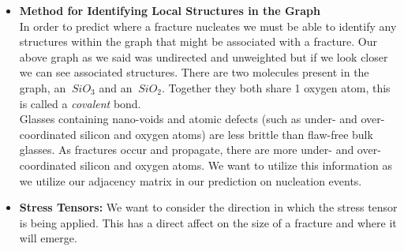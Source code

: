 \begin{itemize}
\item \textbf{Method for Identifying Local Structures in the Graph}
\bigskip
\\
In order to predict where a fracture nucleates we must be able to identify any structures within the graph that might be associated with a fracture. Our above graph as we said was undirected and unweighted but if we look closer we can see associated structures. There are two molecules present in the graph, an $\ SiO_{3}$ and an $\ SiO_{2}$. Together they both share 1 oxygen atom, this is called a \textit{covalent} bond.
\bigskip
\\
Glasses containing nano-voids and atomic defects (such as under- and over-coordinated silicon and oxygen atoms) are less brittle than flaw-free bulk glasses. As fractures occur and propagate, there are more under- and over-coordinated silicon and oxygen atoms. We want to utilize this information as we utilize our adjacency matrix in our prediction on nucleation events. 
    \item \textbf{Stress Tensors:} We want to consider the direction in which the stress tensor is being applied. This has a direct affect on the size of a fracture and where it will emerge.
\end{itemize}

